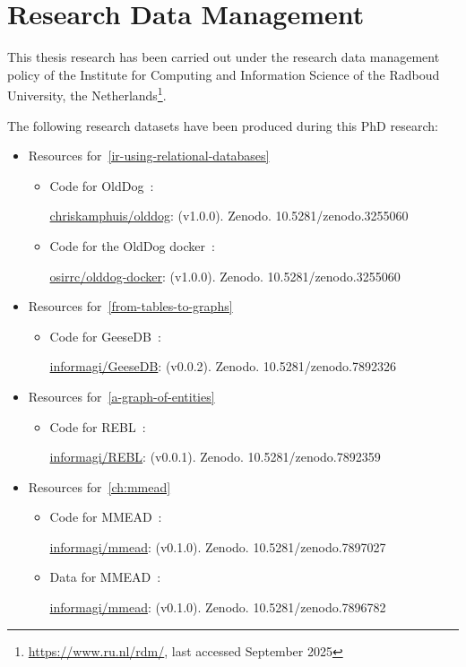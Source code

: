 \chapter*{Research Data Management}
\label{chp:research_data_management}

This thesis research has been carried out under the research data management policy of the Institute for Computing and Information Science of the Radboud University, the Netherlands\footnote{\url{https://www.ru.nl/rdm/}, last accessed September 2025}.

The following research datasets have been produced during this PhD research:

\begin{itemize}
	\item Resources for~\cref{ir-using-relational-databases}
	\begin{itemize}
		\item Code for OldDog~\citep{olddog-docker}:
		
		\href{https://doi.org/10.5281/zenodo.7892260}{chriskamphuis/olddog}: (v1.0.0). Zenodo. 10.5281/zenodo.3255060
		
		\item Code for the OldDog docker~\citep{olddog-docker}:
		
		\href{https://doi.org/10.5281/zenodo.3255060}{osirrc/olddog-docker}: (v1.0.0). Zenodo. 10.5281/zenodo.3255060
	\end{itemize}
	
	\item Resources for~\cref{from-tables-to-graphs}
	\begin{itemize}
		\item Code for GeeseDB~\citep{geesedb}:
		
		\href{https://doi.org/10.5281/zenodo.7892326}{informagi/GeeseDB}: (v0.0.2). Zenodo. 10.5281/zenodo.7892326
	\end{itemize}
	
	\item Resources for~\cref{a-graph-of-entities}
	\begin{itemize}
		\item Code for REBL~\citep{rebl}:
		
		\href{https://doi.org/10.5281/zenodo.7892359}{informagi/REBL}: (v0.0.1). Zenodo. 10.5281/zenodo.7892359
	\end{itemize}
	
	\item Resources for~\cref{ch:mmead}
	\begin{itemize}
		\item Code for MMEAD~\citep{mmead}:
		
		\href{https://doi.org/10.5281/zenodo.7897027}{informagi/mmead}: (v0.1.0). Zenodo. 10.5281/zenodo.7897027
		
		\item Data for MMEAD~\citep{mmead}:
		
		\href{https://doi.org/10.5281/zenodo.7896782}{informagi/mmead}: (v0.1.0). Zenodo. 10.5281/zenodo.7896782
	\end{itemize}
	
\end{itemize}